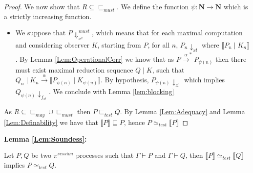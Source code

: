 \begin{proof}
We now show that $R \subseteq \sqsubseteq_{must}$. We define the function $\psi : \mathbf{N} \rightarrow \mathbf{N}$ which is a strictly increasing function.

\begin{itemize}
    \item We suppose that $P \Downarrow^{must}_{x!}$, which means that for each maximal computation and considering observer $K$, starting from $P$, for all $n$, $P_n \downarrow_{x!}$ where $\llbracket P_n \mid K_n \rrbracket$. By Lemma \ref{Lem:OperationalCorr} we know that as $P \xrightarrow{\alpha}^* P_{\psi(n)}$ then there must exist maximal reduction sequence $Q \mid K$, such that $Q_n \mid K_n \xrightarrow{\alpha} \llbracket P_{\psi(n)} \mid K_{\psi(n)} \rrbracket$. By hypothesis, $P_{\psi(n)} \downarrow_{x!}$ which implies $Q_{\psi(n)} \downarrow_{f_{x!}}$. We conclude with Lemma \ref{lem:blocking}
\end{itemize}

As $R \subseteq \sqsubseteq_{may} \cup \sqsubseteq_{must}$ then $P \sqsubseteq_{test} Q$. By Lemma \ref{Lem:Adequacy} and Lemma \ref{Lem:Definability} we have that $\llbracket P \rrbracket \sqsubseteq P$, hence $P \simeq_{test} \llbracket P \rrbracket$

\end{proof}

\vspace{10pt}


\textbf{Lemma \ref{Lem:Soundess}:}

Let $P, Q$ be two $\pi^{session}$ processes such that $\Gamma \vdash P$ and $\Gamma \vdash Q$, then $\llbracket P \rrbracket \simeq_{test} \llbracket Q \rrbracket$ implies $P \simeq_{test} Q$.


